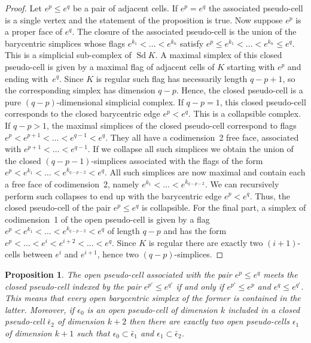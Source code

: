 \documentclass[10pt]{amsart}
\newtheorem{prop}[theo]{Proposition}
\theoremstyle{definition}
\numberwithin{equation}{section}
\numberwithin{figure}{section}
\DeclareMathOperator{\Sd}{Sd}
\begin{document}
\begin{proof}
Let $e^p\leq e^q$ be a pair of adjacent cells. If $e^p=e^q$ the associated pseudo-cell is a single vertex and the statement of the proposition is true. Now suppose $e^p$ is a proper face of $e^q$. The closure of the associated pseudo-cell is the union of the barycentric simplices whose flags $e^{k_1}<\dots<e^{k_n}$ satisfy $e^p\leq e^{k_1}<\dots<e^{k_n}\leq e^q $. This is a simplicial sub-complex of $\Sd K$. A maximal simplex of this closed pseudo-cell is given by a maximal flag of adjacent cells of $K$ starting with $e^p$ and ending with~$e^q$. Since $K$ is regular such flag has necessarily length $q-p+1$, so the corresponding simplex has dimension $q-p$. Hence, the closed pseudo-cell is a pure $(q-p)$-dimensional simplicial complex. If $q-p=1$, this closed pseudo-cell corresponds to the closed barycentric edge $e^p<e^q$. This is a collapsible complex. If $q-p>1$, the maximal simplices of the closed pseudo-cell correspond to flags $e^p<e^{p+1}<\dots<e^{q-1}<e^q$. They all have a codimension~2 free face, associated with $e^{p+1}<\dots<e^{q-1}$. If we collapse all such simplices we obtain the union of the closed $(q-p-1)$-simplices associated with the flags of the form $e^p<e^{k_1}<\dots<e^{k_{q-p-2}}<e^q$. All such simplices are now maximal and contain each a free face of codimension~2, namely $e^{k_1}<\dots<e^{k_{q-p-2}}$. We can recursively perform such collapses to end up with the barycentric edge $e^p<e^q$. Thus, the closed pseudo-cell of the pair $e^p\leq e^q$ is collapsible. For the final part, a simplex of codimension~1 of the open pseudo-cell is given by a flag $e^p<e^{k_1}<\dots<e^{k_{q-p-2}}<e^q$ of length $q-p$ and has the form $e^p<\dots<e^i<e^{i+2}<\dots<e^q$. Since $K$ is regular there are exactly two $(i+1)$-cells between $e^i$ and $e^{i+1}$, hence two $(q-p)$-simplices.
\end{proof}

\begin{prop}
The open pseudo-cell associated with the pair $e^p\leq e^q$ meets the closed pseudo-cell indexed by the pair $e^{p'}\leq e^{q'}$ if and only if $e^{p'}\leq e^{p}$ and $e^q\leq e^{q'}$. This means that every open barycentric simplex of the former is contained in the latter. Moreover, if $\epsilon_0$ is an open pseudo-cell of dimension $k$ included in a closed pseudo-cell $\bar{\epsilon}_2$ of dimension $k+2$ then there are exactly two open pseudo-cells $\epsilon_1$ of dimension $k+1$ such that $\epsilon_0\subset\bar{\epsilon}_1$ and $\epsilon_1\subset\bar{\epsilon}_2$.
\end{prop}
\end{document}
